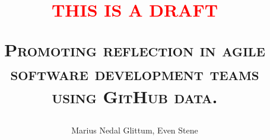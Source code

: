 \documentclass[a4paper, 12pt]{report}
\title{\textcolor{red}{THIS IS A DRAFT}
    \begin{center}
        \textsc{Promoting reflection in agile software development teams using GitHub data.}
    \end{center}
}
\author{Marius Nedal Glittum, Even Stene}
\begin{document}
\maketitle
{}





\tableofcontents

\listoffigures

\clearpage
{} 






















\begin{appendices}
	
    
    
    
    
    
\end{appendices}



\end{document}
